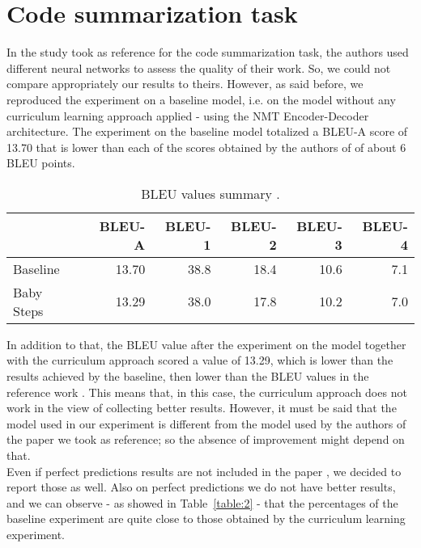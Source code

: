 \section{Code summarization task}
In the study took as reference for the code summarization task, the authors used different neural networks to 
assess the quality of their work. So, we could not compare appropriately our results to theirs.
However, as said before, we reproduced the experiment on a baseline model,
i.e. on the model without any curriculum learning approach applied - using the NMT Encoder-Decoder architecture.
The experiment on the baseline model totalized a BLEU-A score of 13.70 that is lower than 
each of the scores obtained by the authors of \cite{Leclair2020} of about 6 BLEU points. 
\begin{table}[h!]
    \centering
    \begin{tabular}{l|r|r|r|r|r}
     & BLEU-A & BLEU-1 & BLEU-2 & BLEU-3 & BLEU-4\\ [0.5ex] 
     \hline
     Baseline & 13.70 & 38.8 & 18.4 & 10.6 & 7.1\\  
     Baby Steps & 13.29 & 38.0 & 17.8 & 10.2 & 7.0\\ [1ex]
     \end{tabular}
    \caption{BLEU values summary .}
    \label{table:1}
    \end{table}
In addition to that, the BLEU value after the experiment on the model together with the curriculum approach
scored a value of 13.29, which is lower than the results achieved by the baseline, then lower than the BLEU values in the 
reference work \cite{Leclair2020}.
This means that, in this case, the curriculum approach does not work in the view of collecting better results.
However, it must be said that the model used in our experiment is different from the 
model used by the authors of the paper we took as reference; so the absence of improvement might
depend on that.\\
Even if perfect predictions results are not included in the paper \cite{Leclair2020}, we decided to report
those as well. Also on perfect predictions we do not have better results, and we can observe - as showed in Table~\ref{table:2} - that the
percentages of the baseline experiment are quite close to those obtained by the curriculum learning experiment.
